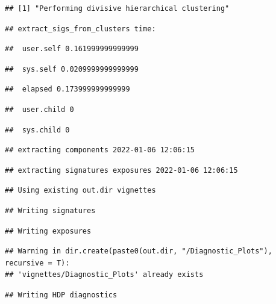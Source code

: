 \documentclass[
]{article}
\begin{document}
\begin{verbatim}
## [1] "Performing divisive hierarchical clustering"
\end{verbatim}

\begin{verbatim}
## extract_sigs_from_clusters time:
\end{verbatim}

\begin{verbatim}
##  user.self 0.161999999999999
\end{verbatim}

\begin{verbatim}
##  sys.self 0.0209999999999999
\end{verbatim}

\begin{verbatim}
##  elapsed 0.173999999999999
\end{verbatim}

\begin{verbatim}
##  user.child 0
\end{verbatim}

\begin{verbatim}
##  sys.child 0
\end{verbatim}

\begin{verbatim}
## extracting components 2022-01-06 12:06:15
\end{verbatim}

\begin{verbatim}
## extracting signatures exposures 2022-01-06 12:06:15
\end{verbatim}

\begin{verbatim}
## Using existing out.dir vignettes
\end{verbatim}

\begin{verbatim}
## Writing signatures
\end{verbatim}

\begin{verbatim}
## Writing exposures
\end{verbatim}

\begin{verbatim}
## Warning in dir.create(paste0(out.dir, "/Diagnostic_Plots"), recursive = T):
## 'vignettes/Diagnostic_Plots' already exists
\end{verbatim}

\begin{verbatim}
## Writing HDP diagnostics
\end{verbatim}
\end{document}
